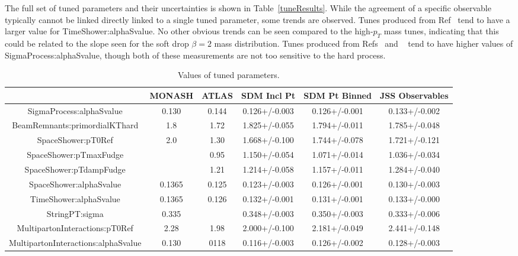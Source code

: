 The full set of tuned parameters and their uncertainties is shown in Table~\ref{tuneResults}. 
While the agreement of a specific observable typically cannot be linked directly linked to a single tuned parameter, some trends are observed.
Tunes produced from Ref~\cite{softdropObs} tend to have a larger value for TimeShower:alphaSvalue. No other obvious trends can be seen compared to the high-$p_T$ mass tunes, 
indicating that this could be related to the slope seen for the soft drop $\beta=2$ mass distribution.
Tunes produced from Refs~\cite{softdropObs} and ~\cite{jssObs} tend to have higher values of SigmaProcess:alphaSvalue, though both of these measurements are not too sensitive to the hard process.


\clearpage
\begin{landscape}
\begin{table}[ht!]
\caption{Values of tuned parameters.}
\centering\begin{tabular}{ | c | | c | c | c | c | c |} \hline
                                     & MONASH   & ATLAS  & SDM Incl Pt   & SDM Pt Binned & JSS Observables  \\ \hline
SigmaProcess:alphaSvalue             &  0.130   & 0.144  & 0.126+/-0.003 & 0.126+/-0.001 & 0.133+/-0.002 \\ \hline
BeamRemnants:primordialKThard        &  1.8     & 1.72   & 1.825+/-0.055 & 1.794+/-0.011 & 1.785+/-0.048 \\ \hline
SpaceShower:pT0Ref                   &  2.0     & 1.30   & 1.668+/-0.100 & 1.744+/-0.078 & 1.721+/-0.121 \\ \hline
SpaceShower:pTmaxFudge               &          & 0.95   & 1.150+/-0.054 & 1.071+/-0.014 & 1.036+/-0.034 \\ \hline
SpaceShower:pTdampFudge              &          & 1.21   & 1.214+/-0.058 & 1.157+/-0.011 & 1.284+/-0.040 \\ \hline
SpaceShower:alphaSvalue              &  0.1365  & 0.125  & 0.123+/-0.003 & 0.126+/-0.001 & 0.130+/-0.003 \\ \hline
TimeShower:alphaSvalue               &  0.1365  & 0.126  & 0.132+/-0.001 & 0.131+/-0.001 & 0.133+/-0.000 \\ \hline
StringPT:sigma                       &  0.335   &        & 0.348+/-0.003 & 0.350+/-0.003 & 0.333+/-0.006 \\ \hline
MultipartonInteractions:pT0Ref       &  2.28    & 1.98   & 2.000+/-0.100 & 2.181+/-0.049 & 2.441+/-0.148 \\ \hline
MultipartonInteractions:alphaSvalue  &  0.130   & 0118   & 0.116+/-0.003 & 0.126+/-0.002 & 0.128+/-0.003 \\ \hline
\end{tabular}
\label{tab:tuneResults}
\end{table}\end{landscape}
\clearpage



